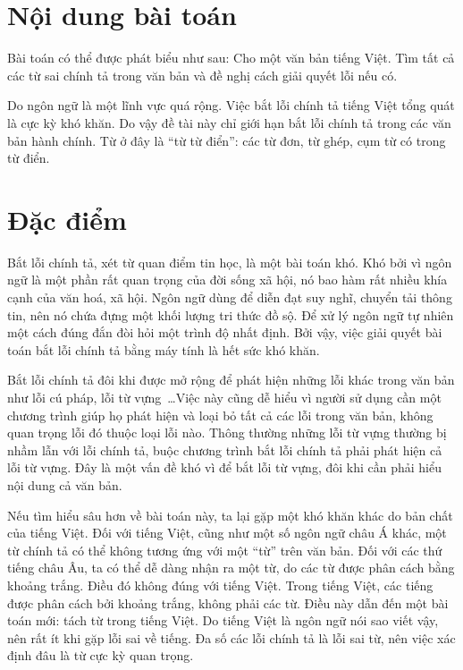 \documentclass[a4paper,oneside]{book} %
\theoremstyle{break}
\begin{document}
\section{Nội dung bài toán}

Bài toán có thể được phát biểu như sau:
Cho một văn bản tiếng Việt. Tìm tất cả các từ sai chính tả trong văn bản
và đề nghị cách giải quyết lỗi nếu có.


Do ngôn ngữ là một lĩnh vực quá rộng. Việc bắt lỗi chính tả tiếng Việt
tổng quát là cực kỳ khó khăn. Do vậy đề tài này chỉ giới hạn bắt lỗi
chính tả trong các văn bản hành chính. Từ ở đây là ``từ từ điển'': các
từ đơn, từ ghép, cụm từ có trong từ điển.

\section{Đặc điểm}

Bắt lỗi chính tả, xét từ quan điểm tin học, là một bài toán khó. Khó
bởi vì ngôn ngữ là một phần rất quan trọng của đời sống xã hội, nó bao
hàm rất nhiều khía cạnh của văn hoá, xã hội. Ngôn ngữ dùng để diễn đạt
suy nghĩ, chuyển tải thông tin, nên nó chứa đựng một khối lượng tri
thức đồ sộ. Để xử lý ngôn ngữ tự nhiên một cách đúng đắn đòi hỏi một
trình độ nhất định. Bởi vậy, việc giải quyết bài toán bắt lỗi chính tả
bằng máy tính là hết sức khó khăn.

Bắt lỗi chính tả đôi khi được mở rộng để phát hiện những lỗi khác
trong văn bản như lỗi cú pháp, lỗi từ vựng~\ldots Việc này cũng dễ
hiểu vì người sử dụng cần một chương trình giúp họ phát hiện và loại
bỏ tất cả các lỗi trong văn bản, không quan trọng lỗi đó thuộc loại
lỗi nào. Thông thường những lỗi từ vựng thường bị nhầm lẫn với lỗi
chính tả, buộc chương trình bắt lỗi chính tả phải phát hiện cả lỗi từ
vựng. Đây là một vấn đề khó vì để bắt lỗi từ vựng, đôi khi cần phải
hiểu nội dung cả văn bản.

Nếu tìm hiểu sâu hơn về bài toán này, ta lại gặp một khó khăn khác do
bản chất của tiếng Việt. Đối với tiếng Việt, cũng như một số
ngôn ngữ châu Á khác, một từ chính tả có thể không tương ứng với một
``từ'' trên văn bản. Đối với các thứ tiếng châu Âu, ta có thể dễ dàng
nhận ra một từ, do các từ được phân cách bằng khoảng trắng. Điều đó
không đúng với tiếng Việt. Trong tiếng Việt, các tiếng được phân cách
bởi khoảng trắng, không phải các từ. Điều này dẫn đến một bài toán
mới: tách từ trong tiếng Việt. Do tiếng Việt là ngôn ngữ nói sao viết
vậy, nên rất ít khi gặp lỗi sai về tiếng. Đa số các lỗi chính tả là
lỗi sai từ, nên việc xác định đâu là từ cực kỳ quan trọng.
\end{document}
